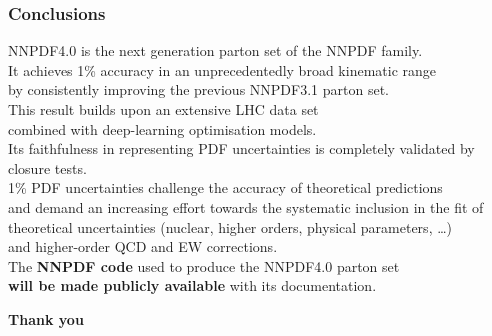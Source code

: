 \documentclass{beamer}
\begin{document}
\begin{frame}
 \frametitle{Conclusions}
 \footnotesize
 \centering
 NNPDF4.0 is the next generation parton set of the NNPDF family.\\
 \vspace{0.3cm}
 It achieves 1\% accuracy in an unprecedentedly broad kinematic range\\
 by consistently improving the previous NNPDF3.1 parton set.\\
 \vspace{0.3cm}
 This result builds upon an extensive LHC data set\\ 
 combined with deep-learning optimisation models.\\
 \vspace{0.3cm}
 Its faithfulness in representing PDF uncertainties is completely validated by closure tests.\\
 \vspace{0.3cm}
 1\% PDF uncertainties challenge the accuracy of theoretical predictions\\
 and demand an increasing effort towards the systematic inclusion in the fit of\\ 
 theoretical uncertainties (nuclear, higher orders, physical parameters, \dots)\\
 and higher-order QCD and EW corrections.\\
 \vspace{0.3cm}
 The {\bf NNPDF code} used to produce the NNPDF4.0 parton set\\ 
 {\bf will be made publicly available} with its documentation.\\
 \vspace{1cm}
 \begin{overlayarea}{\textwidth}{0.5cm}
  {
  }
  {
  \centering
  \Large\bf Thank you
  }
 \end{overlayarea}
\end{frame}
\end{document}
